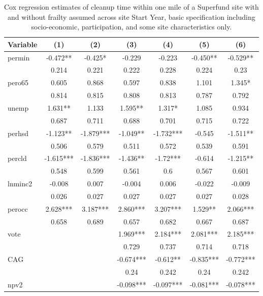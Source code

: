 \documentclass[12pt]{article}
\begin{document}
{\begin{table}[t]
    \centering	\footnotesize
	\caption{\small Cox regression estimates of cleanup time within one mile of a Superfund site with and without frailty assumed across site Start Year, basic specification including socio-economic, participation, and some site characteristics only.} \label{cox1}
	\tabcolsep 9pt
		\begin{tabular}{l|cccccc}
    \hline
        Variable & (1) & (2) & (3) & (4) & (5) & (6) \\ \hline
        permin & -0.472** & -0.425* & -0.229 & -0.223 & -0.450** & -0.529** \\ 
        ~ & 0.214 & 0.221 & 0.222 & 0.228 & 0.224 & 0.23 \\ 
        pero65 & 0.605 & 0.868 & 0.597 & 0.838 & 1.101 & 1.345* \\ 
        ~ & 0.814 & 0.815 & 0.808 & 0.813 & 0.787 & 0.792 \\ 
        unemp & 1.631** & 1.133 & 1.595** & 1.317* & 1.085 & 0.934 \\ 
        ~ & 0.687 & 0.711 & 0.688 & 0.701 & 0.715 & 0.722 \\ 
        perhsd & -1.123** & -1.879*** & -1.049** & -1.732*** & -0.545 & -1.511** \\ 
        ~ & 0.506 & 0.579 & 0.511 & 0.572 & 0.539 & 0.591 \\ 
        percld & -1.615*** & -1.836*** & -1.436** & -1.72*** & -0.614 & -1.215** \\ 
        ~ & 0.548 & 0.599 & 0.561 & 0.6 & 0.567 & 0.601 \\ 
        lnminc2 & -0.008 & 0.007 & -0.004 & 0.006 & -0.022 & -0.009 \\ 
        ~ & 0.026 & 0.027 & 0.027 & 0.027 & 0.027 & 0.028 \\ 
        perocc & 2.628*** & 3.187*** & 2.860*** & 3.207*** & 1.529** & 2.066*** \\ 
        ~ & 0.658 & 0.689 & 0.657 & 0.682 & 0.667 & 0.687 \\ \hline
        vote & ~ & ~ & 1.969*** & 2.184*** & 2.081*** & 2.185*** \\ 
        ~ & ~ & ~ & 0.729 & 0.737 & 0.714 & 0.718 \\ 
        CAG & ~ & ~ & -0.674*** & -0.612** & -0.835*** & -0.772*** \\ 
        ~ & ~ & ~ & 0.24 & 0.242 & 0.24 & 0.242 \\ \hline
        npv2 & ~ & ~ & -0.098*** & -0.097*** & -0.081*** & -0.078*** \\ 

\end{tabular}
\end{table}}
\end{document}
